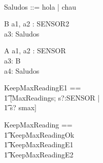 \documentclass{article}
\begin{document}
\begin{zed}
\\
Saludos ::= hola | chau
\end{zed}


\begin{schema}{B}
a1, a2 : SENSOR2 \\
a3: Saludos	
\end{schema}

\begin{schema}{A}
a1, a2 : SENSOR \\
a3: B \\
a4: Saludos	
\end{schema}


\begin{zed}
KeepMaxReadingE1 == \\
  \t1 [\Xi MaxReadings; s?:SENSOR | \\
  \t1 s? \notin \dom smax]
\end{zed}


\begin{zed}
KeepMaxReading == \\
  \t1 KeepMaxReadingOk \\
  \t1 \lor KeepMaxReadingE1 \\
  \t1 \lor KeepMaxReadingE2
\end{zed}
\end{document}
